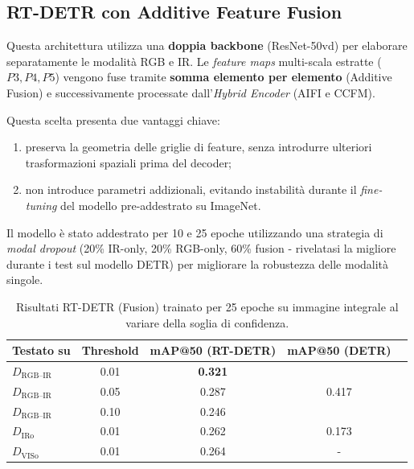 \documentclass[a4paper,11pt]{article}
\begin{document}
\subsection{RT-DETR con Additive Feature Fusion}
Questa architettura utilizza una \textbf{doppia backbone} (ResNet-50vd) 
per elaborare separatamente le modalità RGB e IR. Le \emph{feature maps} 
multi-scala estratte ($P3, P4, P5$) vengono fuse tramite 
\textbf{somma elemento per elemento} (Additive Fusion) e successivamente 
processate dall'\emph{Hybrid Encoder} (AIFI e CCFM). 

Questa scelta presenta due vantaggi chiave: 
\begin{enumerate}
    \item preserva la geometria delle griglie di feature, senza introdurre ulteriori trasformazioni spaziali prima del decoder; 
    \item non introduce parametri addizionali, evitando instabilità 
        durante il \emph{fine-tuning} del modello pre-addestrato su ImageNet.
\end{enumerate}

Il modello è stato addestrato per 10 e 25 epoche utilizzando una strategia 
di \emph{modal dropout} (20\% IR-only, 20\% RGB-only, 60\% fusion - rivelatasi la migliore durante i test sul modello DETR)
per migliorare la robustezza delle modalità singole.

\begin{table}[h]
\centering
\caption{Risultati RT-DETR (Fusion) trainato per 25 epoche su immagine integrale al variare della soglia di confidenza.}
\label{tab:rtdetr_base_25}
\begin{tabular}{lcccc}
\toprule
Testato su & Threshold & mAP@50 (RT-DETR) & mAP@50 (DETR) \\
\midrule
$D_{\text{RGB--IR}}$ & 0.01 & \textbf{0.321} & \multirow{3}{*}{0.417} \\
$D_{\text{RGB--IR}}$ & 0.05 & 0.287 & \\
$D_{\text{RGB--IR}}$ & 0.10 & 0.246 & \\
\midrule
$D_{\text{IRo}}$ & 0.01 & 0.262 & 0.173 \\
$D_{\text{VISo}}$ & 0.01 & 0.264 & - \\
\bottomrule
\end{tabular}
\end{table}
\end{document}
